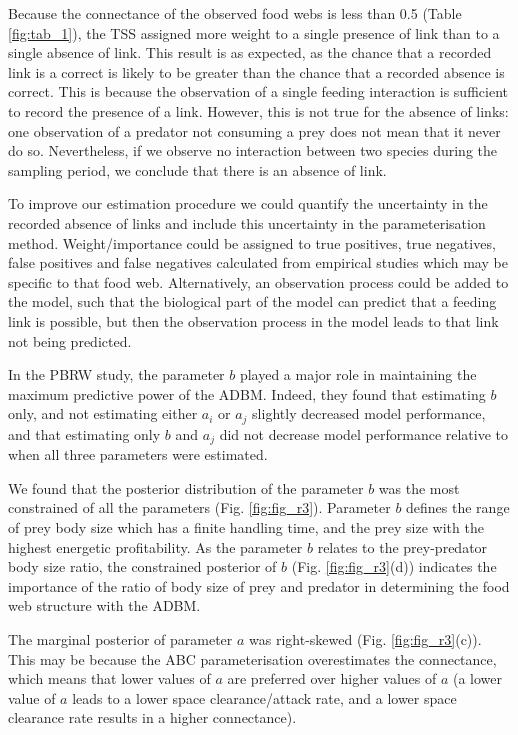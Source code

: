 \documentclass{article}
\begin{document}
Because the connectance of the observed food webs is less than 0.5
(Table \ref{fig:tab_1}), the TSS assigned more weight to a single
presence of link than to a single absence of link. This result is as
expected, as the chance that a recorded link is a correct is likely to
be greater than the chance that a recorded absence is correct. This is
because the observation of a single feeding interaction is sufficient to
record the presence of a link. However, this is not true for the absence
of links: one observation of a predator not consuming a prey does not
mean that it never do so. Nevertheless, if we observe no interaction
between two species during the sampling period, we conclude that there
is an absence of link.

To improve our estimation procedure we could quantify the uncertainty in
the recorded absence of links and include this uncertainty in the
parameterisation method. Weight/importance could be assigned to true
positives, true negatives, false positives and false negatives
calculated from empirical studies which may be specific to that food
web. Alternatively, an observation process could be added to the model,
such that the biological part of the model can predict that a feeding
link is possible, but then the observation process in the model leads to
that link not being predicted.

In the PBRW study, the parameter \(b\) played a major role in
maintaining the maximum predictive power of the ADBM. Indeed, they found
that estimating \(b\) only, and not estimating either \(a_i\) or \(a_j\)
slightly decreased model performance, and that estimating only \(b\) and
\(a_j\) did not decrease model performance relative to when all three
parameters were estimated.

We found that the posterior distribution of the parameter \(b\) was the
most constrained of all the parameters (Fig. \ref{fig:fig_r3}).
Parameter \(b\) defines the range of prey body size which has a finite
handling time, and the prey size with the highest energetic
profitability. As the parameter \(b\) relates to the prey-predator body
size ratio, the constrained posterior of \(b\) (Fig.
\ref{fig:fig_r3}(d)) indicates the importance of the ratio of body size
of prey and predator in determining the food web structure with the
ADBM.

The marginal posterior of parameter \(a\) was right-skewed (Fig.
\ref{fig:fig_r3}(c)). This may be because the ABC parameterisation
overestimates the connectance, which means that lower values of \(a\)
are preferred over higher values of \(a\) (a lower value of \(a\) leads
to a lower space clearance/attack rate, and a lower space clearance rate
results in a higher connectance).
\end{document}

